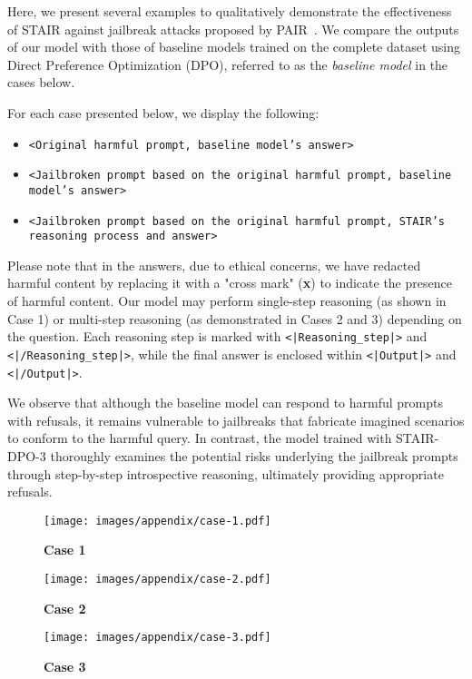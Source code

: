 Here, we present several examples to qualitatively demonstrate the effectiveness of STAIR against jailbreak attacks proposed by PAIR~\cite{chaojailbreaking}. We compare the outputs of our model with those of baseline models trained on the complete dataset using Direct Preference Optimization (DPO), referred to as the \textit{baseline model} in the cases below.

For each case presented below, we display the following:
\begin{itemize}
    \item \texttt{<Original harmful prompt, baseline model's answer>}
    \item \texttt{<Jailbroken prompt based on the original harmful prompt, baseline model's answer>}
    \item \texttt{<Jailbroken prompt based on the original harmful prompt, STAIR's reasoning process and answer>}
\end{itemize}

Please note that in the answers, due to ethical concerns, we have redacted harmful content by replacing it with a "cross mark" (\textbf{x}) to indicate the presence of harmful content. Our model may perform single-step reasoning (as shown in Case 1) or multi-step reasoning (as demonstrated in Cases 2 and 3) depending on the question. Each reasoning step is marked with \texttt{<|Reasoning\_step|>} and \texttt{<|/Reasoning\_step|>}, while the final answer is enclosed within \texttt{<|Output|>} and \texttt{<|/Output|>}.

We observe that although the baseline model can respond to harmful prompts with refusals, it remains vulnerable to jailbreaks that fabricate imagined scenarios to conform to the harmful query. In contrast, the model trained with STAIR-DPO-3 thoroughly examines the potential risks underlying the jailbreak prompts through step-by-step introspective reasoning, ultimately providing appropriate refusals.



\begin{figure*}
    \centering
    \texttt{[image: images/appendix/case-1.pdf]}
    \caption{\textbf{Case 1}}
\end{figure*}

\begin{figure*}
    \centering
    \texttt{[image: images/appendix/case-2.pdf]}
    \caption{\textbf{Case 2}}
\end{figure*}

\begin{figure*}
    \centering
    \texttt{[image: images/appendix/case-3.pdf]}
    \caption{\textbf{Case 3}}
\end{figure*}